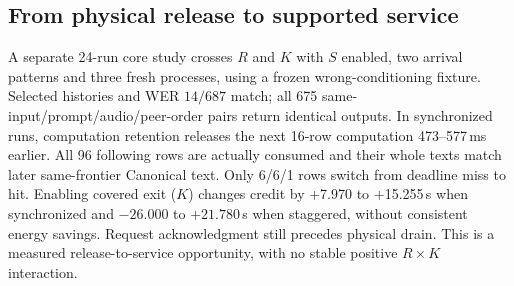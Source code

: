 \subsection{From physical release to supported service}
\label{subsec:release_evidence}
A separate 24-run core study crosses $R$ and $K$ with $S$ enabled,
two arrival patterns and three fresh processes, using a frozen
wrong-conditioning fixture. Selected histories and WER $14/687$ match;
all 675 same-input/prompt/audio/peer-order pairs return identical outputs.
In synchronized runs, computation retention releases the next 16-row
computation 473--577\,ms earlier. All 96 following rows are actually consumed and their whole
texts match later same-frontier Canonical text. Only 6/6/1 rows switch
from deadline miss to hit. Enabling covered exit ($K$) changes credit by +7.970 to
+15.255\,s when synchronized and $-26.000$ to $+21.780$\,s when
staggered, without consistent energy savings. Request acknowledgment
still precedes physical drain. This is a measured release-to-service
opportunity, with no stable positive $R\times K$ interaction.

